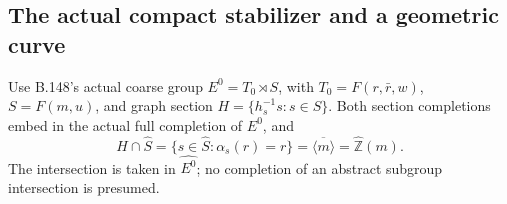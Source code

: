\subsection*{The actual compact stabilizer and a geometric curve}
\label{stmt:B153}
Use B.148's actual coarse group $E^0=T_0\rtimes S$, with
$T_0=F(r,\bar r,w)$, $S=F(m,u)$, and graph section
$H=\{h_s^{-1}s:s\in S\}$. Both section completions embed in the
actual full completion of $E^0$, and
\begin{equation}\label{eq:B153-conclusion}
 \widehat H\cap\widehat S
 =\{s\in\widehat S:\alpha_s(r)=r\}
 =\overline{\langle m\rangle}
 =\widehat{\mathbb Z}(m).
\end{equation}
The intersection is taken in $\widehat{E^0}$; no completion of an
abstract subgroup intersection is presumed.
